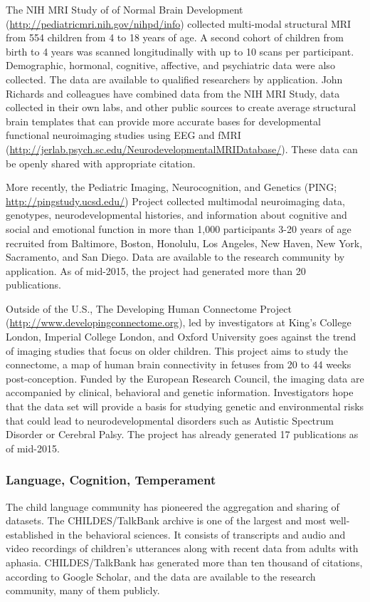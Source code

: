\documentclass[letterpaper,man,apacite]{apa6}
\begin{document}
The NIH MRI Study of of Normal Brain Development (\url{http://pediatricmri.nih.gov/nihpd/info}) collected multi-modal structural MRI from 554 children from 4 to 18 years of age.
A second cohort of children from birth to 4 years was scanned longitudinally with up to 10 scans per participant. 
Demographic, hormonal, cognitive, affective, and psychiatric data were also collected.
The data are available to qualified researchers by application.
John Richards and colleagues have combined data from the NIH MRI Study, data collected in their own labs, and other public sources to create average structural brain templates that can provide more accurate bases for developmental functional neuroimaging studies using EEG and fMRI (\url{http://jerlab.psych.sc.edu/NeurodevelopmentalMRIDatabase/}).
These data can be openly shared with appropriate citation.

More recently, the Pediatric Imaging, Neurocognition, and Genetics (PING; \url{http://pingstudy.ucsd.edu/}) Project collected multimodal neuroimaging data, genotypes, neurodevelopmental histories, and information about cognitive and social and emotional function in more than 1,000 participants 3-20 years of age recruited from Baltimore, Boston, Honolulu, Los Angeles, New Haven, New York, Sacramento, and San Diego. 
Data are available to the research community by application.
As of mid-2015, the project had generated more than 20 publications.

Outside of the U.S., The Developing Human Connectome Project (\url{http://www.developingconnectome.org}), led by investigators at King’s College London, Imperial College London, and Oxford University goes against the trend of imaging studies that focus on older children.
This project aims to study the connectome, a map of human brain connectivity in fetuses from 20 to 44 weeks post-conception.
Funded by the European Research Council, the imaging data are accompanied by clinical, behavioral and genetic information.
Investigators hope that the data set will provide a basis for studying genetic and environmental risks that could lead to neurodevelopmental disorders such as Autistic Spectrum Disorder or Cerebral Palsy.
The project has already generated 17 publications as of mid-2015.

\subsubsection{Language, Cognition, Temperament}

The child language community has pioneered the aggregation and sharing of datasets.
The CHILDES/TalkBank \cite{macwhinney_childes_2001} archive is one of the largest and most well-established in the behavioral sciences.
It consists of transcripts and audio and video recordings of children's utterances along with recent data from adults with aphasia.
CHILDES/TalkBank has generated more than ten thousand of citations, according to Google Scholar, and the data are available to the research community, many of them publicly.
\end{document}
